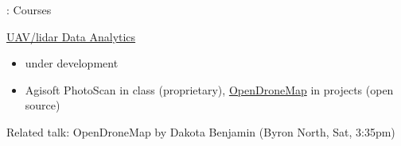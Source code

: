 \documentclass[xcolor={dvipsnames,usenames},beamer,aspectratio=169]{beamer}
\begin{document}
\begin{frame}{\geoforalllab: Courses}


\begin{block}{\href{http://ncsu-osgeorel.github.io/uav-lidar-analytics-course/}%
  {UAV/lidar Data Analytics}}
\begin{itemize}
 \item under development
 \item Agisoft PhotoScan in class (proprietary), \href{http://opendronemap.org/}{OpenDroneMap} in projects (open source)
\end{itemize}

Related talk:
OpenDroneMap by Dakota Benjamin (Byron North, Sat, 3:35pm)

\end{block}

\begin{columns}[c]


\end{columns}
\end{frame}
\end{document}
